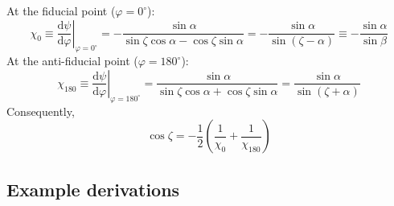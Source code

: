 \documentclass{book}
\newcommand{\phase}{\varphi}
\newcommand{\deriv}[2]{\frac{\text{d}{#1}}{\text{d}{#2}}}
\begin{document}
At the fiducial point ($\phase = 0^\circ$):
\begin{equation}
    \chi_0 \equiv \left.\deriv{\psi}{\phase}\right|_{\phase = 0^\circ}
        = -\frac{\sin\alpha}{\sin\zeta\cos\alpha - \cos\zeta\sin\alpha}
        = -\frac{\sin\alpha}{\sin(\zeta - \alpha)}
        \equiv -\frac{\sin\alpha}{\sin\beta}
\end{equation}
At the anti-fiducial point ($\phase = 180^\circ$):
\begin{equation}
    \chi_{180} \equiv \left.\deriv{\psi}{\phase}\right|_{\phase = 180^\circ}
        = \frac{\sin\alpha}{\sin\zeta\cos\alpha + \cos\zeta\sin\alpha}
        = \frac{\sin\alpha}{\sin(\zeta + \alpha)}
\end{equation}
Consequently,
\begin{equation}
    \cos\zeta = -\frac{1}{2}\left(\frac{1}{\chi_0} + \frac{1}{\chi_{180}}\right)
\end{equation}

\subsection{Example derivations}
\end{document}
